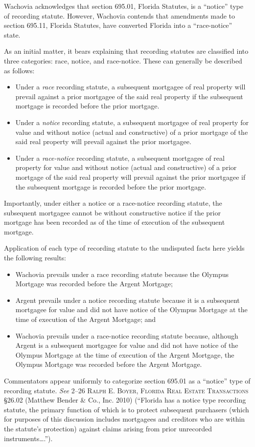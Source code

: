 Wachovia acknowledges that section 695.01, Florida Statutes, is a ``notice''
type of recording statute. However, Wachovia contends that amendments made
to section 695.11, Florida Statutes, have converted Florida into a
``race-notice'' state.

As an initial matter, it bears explaining that recording statutes are classified
into three categories: race, notice, and race-notice. These can generally be
described as follows:
\begin{itemize}
\item Under a \textit{race} recording statute, a subsequent mortgagee of real
property will prevail against a prior mortgagee of the said real property if
the subsequent mortgage is recorded before the prior mortgage.
\item Under a \textit{notice} recording statute, a subsequent mortgagee of real
property for value and without notice (actual and constructive) of a prior
mortgage of the said real property will prevail against the prior mortgagee.
\item Under a \textit{race-notice} recording statute, a subsequent mortgagee of
real property for value and without notice (actual and constructive) of a prior
mortgage of the said real property will prevail against the prior mortgagee if
the subsequent mortgage is recorded before the prior mortgage.
\end{itemize}
Importantly, under either a notice or a race-notice recording statute, the
subsequent mortgagee cannot be without constructive notice if the prior
mortgage has been recorded as of the time of execution of the subsequent
mortgage.

Application of each type of recording statute to the undisputed facts here
yields the following results:
\begin{itemize}
\item Wachovia prevails under a race recording statute because the Olympus
Mortgage was recorded before the Argent Mortgage;
\item Argent prevails under a notice recording statute because it is a
subsequent mortgagee for value and did not have notice of the Olympus Mortgage
at the time of execution of the Argent Mortgage; and
\item Wachovia prevails under a race-notice recording statute because, although
Argent is a subsequent mortgagee for value and did not have notice of the
Olympus Mortgage at the time of execution of the Argent Mortgage, the Olympus
Mortgage was recorded before the Argent Mortgage.
\end{itemize}
Commentators appear uniformly to categorize section 695.01 as a ``notice'' type
of recording statute. \textit{See} 2--26 \textsc{Ralph E.
Boyer, Florida Real Estate Transactions} \S 26.02 (Matthew Bender \& Co.,
Inc. 2010) (``Florida has a notice type recording statute, the primary function
of which is to protect subsequent purchasers (which for purposes of this
discussion includes mortgagees and creditors who are within the statute's
protection) against claims arising from prior unrecorded instruments\ldots.'').

